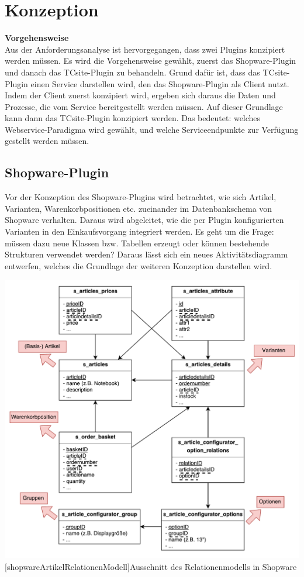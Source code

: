 \documentclass[12pt,a4paper,bibliography=totocnumbered,listof=totoc]{scrartcl}
\begin{document}
\section{Konzeption}
\textbf{Vorgehensweise}\\
Aus der Anforderungsanalyse ist hervorgegangen, dass zwei Plugins konzipiert werden müssen. Es wird die Vorgehensweise gewählt, zuerst das Shopware-Plugin und danach das TCsite-Plugin zu behandeln. Grund dafür ist, dass das TCsite-Plugin einen Service darstellen wird, den das Shopware-Plugin als Client nutzt. Indem der Client zuerst konzipiert wird, ergeben sich daraus die Daten und Prozesse, die vom Service bereitgestellt werden müssen. Auf dieser Grundlage kann dann das TCsite-Plugin konzipiert werden. Das bedeutet: welches Webservice-Paradigma wird gewählt, und welche Serviceendpunkte zur Verfügung gestellt werden müssen.

\subsection{Shopware-Plugin}
Vor der Konzeption des Shopware-Plugins wird betrachtet, wie sich Artikel, Varianten, Warenkorbpositionen etc. zueinander im Datenbankschema von Shopware verhalten. Daraus wird abgeleitet, wie die per Plugin konfigurierten Varianten in den Einkaufsvorgang integriert werden. Es geht um die Frage: müssen dazu neue Klassen bzw. Tabellen erzeugt oder können bestehende Strukturen verwendet werden? Daraus lässt sich ein neues Aktivitätsdiagramm entwerfen, welches die Grundlage der weiteren Konzeption darstellen wird.

\vspace{1em}
\begin{minipage}{\linewidth}
	\centering
	\includegraphics[width=0.6\linewidth]{Abbildungen/shopwareArtikelRelationenModell.pdf}
	[shopwareArtikelRelationenModell]{Ausschnitt des Relationenmodells in Shopware}
	\label{fig:shopwareArtikelRelationenModell}
\end{minipage}
\vspace{1em}
\end{document}

